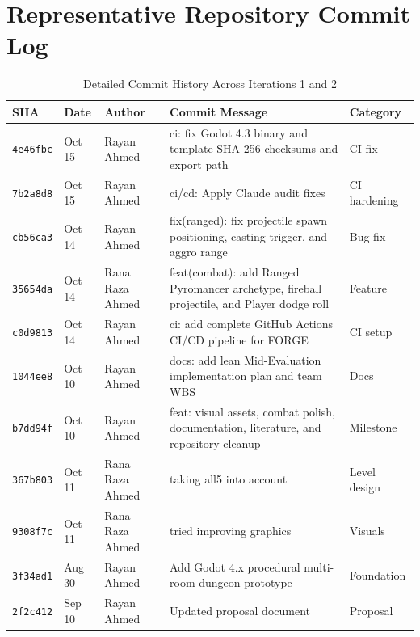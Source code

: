 \section{Representative Repository Commit Log}

\begin{table}[!htbp]
\centering
\caption{Detailed Commit History Across Iterations 1 and 2}
\label{tab:app_commits}
\small
\begin{tabular}{p{}p{}p{}p{}p{}}
\toprule
\textbf{SHA} & \textbf{Date} & \textbf{Author} & \textbf{Commit Message} & \textbf{Category} \\
\midrule
\texttt{4e46fbc} & Oct 15 & Rayan Ahmed & ci: fix Godot 4.3 binary and template SHA-256 checksums and export path & CI fix \\
\texttt{7b2a8d8} & Oct 15 & Rayan Ahmed & ci/cd: Apply Claude audit fixes & CI hardening \\
\texttt{cb56ca3} & Oct 14 & Rayan Ahmed & fix(ranged): fix projectile spawn positioning, casting trigger, and aggro range & Bug fix \\
\texttt{35654da} & Oct 14 & Rana Raza Ahmed & feat(combat): add Ranged Pyromancer archetype, fireball projectile, and Player dodge roll & Feature \\
\texttt{c0d9813} & Oct 14 & Rayan Ahmed & ci: add complete GitHub Actions CI/CD pipeline for FORGE & CI setup \\
\texttt{1044ee8} & Oct 10 & Rayan Ahmed & docs: add lean Mid-Evaluation implementation plan and team WBS & Docs \\
\texttt{b7dd94f} & Oct 10 & Rayan Ahmed & feat: visual assets, combat polish, documentation, literature, and repository cleanup & Milestone \\
\texttt{367b803} & Oct 11 & Rana Raza Ahmed & taking all5 into account & Level design \\
\texttt{9308f7c} & Oct 11 & Rana Raza Ahmed & tried improving graphics & Visuals \\
\texttt{3f34ad1} & Aug 30 & Rayan Ahmed & Add Godot 4.x procedural multi-room dungeon prototype & Foundation \\
\texttt{2f2c412} & Sep 10 & Rayan Ahmed & Updated proposal document & Proposal \\
\bottomrule
\end{tabular}
\end{table}

